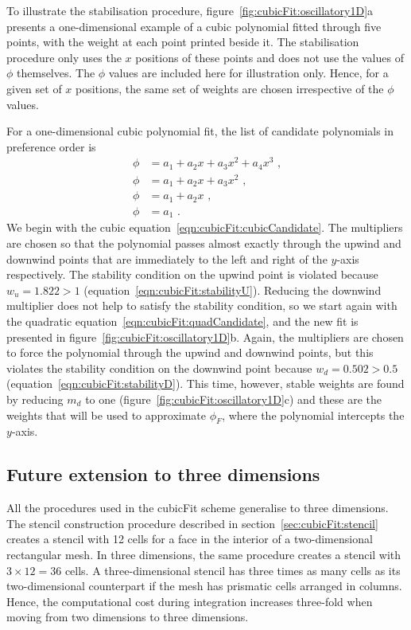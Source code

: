 To illustrate the stabilisation procedure, figure~\ref{fig:cubicFit:oscillatory1D}a presents a one-dimensional example of a cubic polynomial fitted through five points, with the weight at each point printed beside it.
The stabilisation procedure only uses the $x$ positions of these points and does not use the values of $\phi$ themselves.  The $\phi$ values are included here for illustration only.
Hence, for a given set of $x$ positions, the same set of weights are chosen irrespective of the $\phi$ values.

For a one-dimensional cubic polynomial fit, the list of candidate polynomials in preference order is
\begin{align}
	\phi &= a_1 + a_2 x + a_3 x^2 + a_4 x^3 \label{eqn:cubicFit:cubicCandidate} \text{ ,} \\
	\phi &= a_1 + a_2 x + a_3 x^2 \label{eqn:cubicFit:quadCandidate} \text{ ,} \\
	\phi &= a_1 + a_2 x \text{ ,} \\
	\phi &= a_1 \text{ .}
\end{align}
We begin with the cubic equation~\eqref{eqn:cubicFit:cubicCandidate}.  The multipliers are chosen so that the polynomial passes almost exactly through the upwind and downwind points that are immediately to the left and right of the $y$-axis respectively.
The stability condition on the upwind point is violated because $w_u = 1.822 > 1$ (equation~\ref{eqn:cubicFit:stabilityU}).  Reducing the downwind multiplier does not help to satisfy the stability condition, so we start again with the quadratic equation~\eqref{eqn:cubicFit:quadCandidate}, and the new fit is presented in figure~\ref{fig:cubicFit:oscillatory1D}b.
Again, the multipliers are chosen to force the polynomial through the upwind and downwind points, but this violates the stability condition on the downwind point because $w_d = 0.502 > 0.5$ (equation~\ref{eqn:cubicFit:stabilityD}).  This time, however, stable weights are found by reducing $m_d$ to one (figure~\ref{fig:cubicFit:oscillatory1D}c) and these are the weights that will be used to approximate $\phi_F$, where the polynomial intercepts the $y$-axis.

\subsection{Future extension to three dimensions}
All the procedures used in the cubicFit scheme generalise to three dimensions.  The stencil construction procedure described in section~\ref{sec:cubicFit:stencil} creates a stencil with \num{12} cells for a face in the interior of a two-dimensional rectangular mesh.  In three dimensions, the same procedure creates a stencil with $3 \times 12 = 36$ cells.
A three-dimensional stencil has three times as many cells as its two-dimensional counterpart if the mesh has prismatic cells arranged in columns.  Hence, the computational cost during integration increases three-fold when moving from two dimensions to three dimensions.

